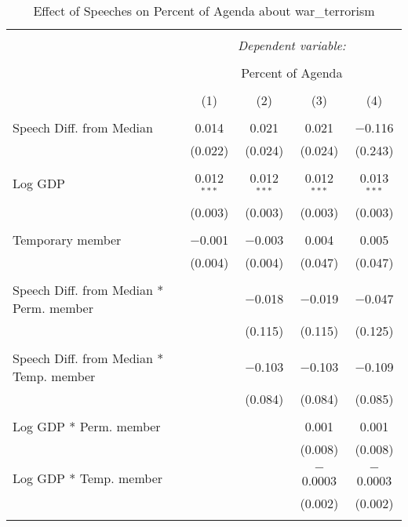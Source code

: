 
\begin{table}[!htbp] \centering 
  \caption{Effect of Speeches on Percent of Agenda about war_terrorism} 
  \label{} 
\begin{tabular}{@{\extracolsep{5pt}}lcccc} 
\\[-1.8ex]\hline 
\hline \\[-1.8ex] 
 & \multicolumn{4}{c}{\textit{Dependent variable:}} \\ 
\cline{2-5} 
\\[-1.8ex] & \multicolumn{4}{c}{Percent of Agenda} \\ 
\\[-1.8ex] & (1) & (2) & (3) & (4)\\ 
\hline \\[-1.8ex] 
 Speech Diff. from Median & 0.014 & 0.021 & 0.021 & $-$0.116 \\ 
  & (0.022) & (0.024) & (0.024) & (0.243) \\ 
  & & & & \\ 
 Log GDP & 0.012$^{***}$ & 0.012$^{***}$ & 0.012$^{***}$ & 0.013$^{***}$ \\ 
  & (0.003) & (0.003) & (0.003) & (0.003) \\ 
  & & & & \\ 
 Temporary member & $-$0.001 & $-$0.003 & 0.004 & 0.005 \\ 
  & (0.004) & (0.004) & (0.047) & (0.047) \\ 
  & & & & \\ 
 Speech Diff. from Median * Perm. member &  & $-$0.018 & $-$0.019 & $-$0.047 \\ 
  &  & (0.115) & (0.115) & (0.125) \\ 
  & & & & \\ 
 Speech Diff. from Median * Temp. member &  & $-$0.103 & $-$0.103 & $-$0.109 \\ 
  &  & (0.084) & (0.084) & (0.085) \\ 
  & & & & \\ 
 Log GDP * Perm. member &  &  & 0.001 & 0.001 \\ 
  &  &  & (0.008) & (0.008) \\ 
  & & & & \\ 
 Log GDP * Temp. member &  &  & $-$0.0003 & $-$0.0003 \\ 
  &  &  & (0.002) & (0.002) \\ 
  & & & & \\ 

\end{tabular}
\end{table}
